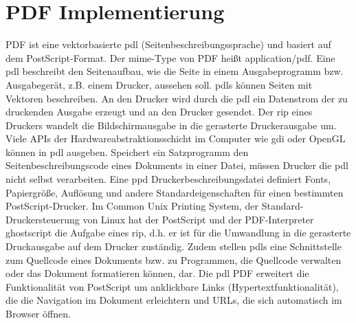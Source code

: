 \section{PDF Implementierung}
PDF ist eine vektorbasierte \gls{pdl} (Seitenbeschreibungssprache) und basiert auf dem PostScript-Format. Der \gls{mime}-Type von PDF heißt application/pdf. Eine \gls{pdl} beschreibt den Seitenaufbau, wie die Seite in einem Ausgabeprogramm bzw. Ausgabegerät, z.B. einem Drucker, aussehen soll. \gls{pdl}s können Seiten mit Vektoren beschreiben. An den Drucker wird durch die \gls{pdl} ein Datenstrom der zu druckenden Ausgabe erzeugt und an den Drucker gesendet. Der \gls{rip} eines Druckers wandelt die Bildschirmausgabe in die gerasterte Druckerausgabe um. Viele APIs der Hardwareabstraktionsschicht im Computer wie \gls{gdi} oder OpenGL können in \gls{pdl} ausgeben. Speichert ein Satzprogramm den Seitenbeschreibungscode eines Dokuments in einer Datei, müssen Drucker die \gls{pdl} nicht selbst verarbeiten. Eine \gls{ppd} Druckerbeschreibungsdatei definiert Fonts, Papiergröße, Auflösung und andere Standardeigenschaften für einen bestimmten PostScript-Drucker. \cite{ppd-file} Im Common Unix Printing System, der Standard-Druckersteuerung von Linux hat der PostScript und der PDF-Interpreter ghostscript die Aufgabe eines \gls{rip}, d.h. er ist für die Umwandlung in die gerasterte Druckausgabe auf dem Drucker zuständig. Zudem stellen \gls{pdl}s eine Schnittstelle zum Quellcode eines Dokuments bzw. zu Programmen, die Quellcode verwalten oder das Dokument formatieren können, dar. Die \gls{pdl} PDF erweitert die Funktionalität von PostScript um anklickbare Links (Hypertextfunktionalität), die die Navigation im Dokument erleichtern und URLs, die sich automatisch im Browser öffnen. \cite{wiki-pdl} 

